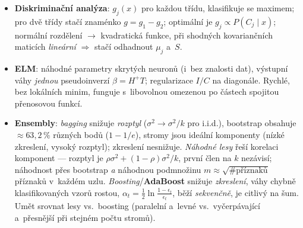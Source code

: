 \documentclass[11pt,a4paper]{article}
\theoremstyle{definition}
\begin{document}
\begin{itemize}
 entropie; $\sigma'=\sigma(1-\sigma)$ $\Rightarrow$ adaptační pravidlo
 $\Delta\beta_j=\eta\sum_i(y_i-\sigma(z_i))x_{ij}$.
\item \textbf{Diskriminační analýza}: $g_j(x)$ pro každou třídu, klasifikuje se maximem; pro
 dvě třídy stačí znaménko $g=g_1-g_2$; optimální je $g_j\propto P(C_j\mid x)$; normální
 rozdělení $\to$ kvadratická funkce, při shodných kovariančních maticích \emph{lineární}
 $\Rightarrow$ stačí odhadnout $\mu_j$ a~$S$.
\item \textbf{ELM}: náhodné parametry skrytých neuronů (i~bez znalosti dat), výstupní váhy
 \emph{jednou} pseudoinverzí $\beta=H^{+}T$; regularizace $I/C$ na diagonále. Rychlé,
 bez lokálních minim, funguje s~libovolnou omezenou po částech spojitou přenosovou funkcí.
\item \textbf{Ensembly}: \emph{bagging} snižuje \emph{rozptyl} ($\sigma^2\to\sigma^2/k$ pro
 i.i.d.), bootstrap obsahuje $\approx 63{,}2\,\%$ různých bodů ($1-1/e$), stromy jsou
 ideální komponenty (nízké zkreslení, vysoký rozptyl); zkreslení nesnižuje.
 \emph{Náhodné lesy} řeší korelaci komponent --- rozptyl je
 $\rho\sigma^2+(1-\rho)\sigma^2/k$, první člen na $k$ nezávisí; náhodnost přes bootstrap
 \emph{a} náhodnou podmnožinu $m\approx\sqrt{\#\text{příznaků}}$ příznaků v~každém uzlu.
 \emph{Boosting}/\textbf{AdaBoost} snižuje \emph{zkreslení}, váhy chybně klasifikovaných
 vzorů rostou, $\alpha_t=\frac12\ln\frac{1-\epsilon_t}{\epsilon_t}$, běží
 \emph{sekvenčně}, je citlivý na šum. Umět srovnat lesy vs.\ boosting (paralelní
 a~levné vs.\ vyčerpávající a~přesnější při stejném počtu stromů).
\end{itemize}
\end{document}

